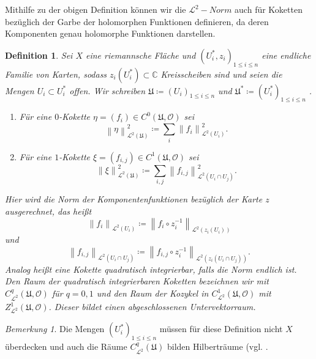 \documentclass[11pt,a4paper,toc=bibliography]{scrartcl}
\theoremstyle{thm}
\theoremstyle{def}
\newtheorem{defi}{Definition}[section]
\theoremstyle{remark}
\newtheorem*{bem}{Bemerkung}
\newcommand*{\norm}[1]{\left\lVert#1\right\rVert} %
\begin{document}
Mithilfe zu der obigen Definition können wir die $\mathcal{L}^2-Norm$ auch für Koketten bezüglich der Garbe der holomorphen Funktionen definieren, da deren Komponenten genau holomorphe Funktionen darstellen.
\begin{defi}
Sei $X$ eine riemannsche Fläche und $\left( U_i^{*},z_i\right)_{1\leq i\leq n}$ eine endliche Familie von Karten, sodass $z_i(U_i^{*})\subset \mathbb{C}$ Kreisscheiben sind und seien die Mengen $U_i\subset U_i^{*}$ offen. Wir schreiben $\mathfrak{U}\coloneqq\left( U_i \right)_{1\leq i\leq n}$ und $\mathfrak{U}^{*}\coloneqq\left( U_i^{*}\right)_{1\leq i\leq n}$ .
\begin{enumerate}
\item
Für eine $0$-Kokette $\eta = (f_i)\in C^0(\mathfrak{U},\mathcal{O})$ sei
$$
\norm{\eta}_{\mathcal{L}^2(\mathfrak{U})}^2 \coloneqq \sum_i \norm{f_i}_{\mathcal{L}^2(U_i)}^2.
$$
\item
Für eine $1$-Kokette $\xi= (f_{i,j})\in C^1(\mathfrak{U,\mathcal{O}}) $ sei 
$$
\norm{\xi}_{\mathcal{L}^2 (\mathfrak{U})}^2\coloneqq \sum_{i,j} \norm{f_{i,j}}_{\mathcal{L}^2(U_i\cap U_j)}^2.
$$
\end{enumerate} 
Hier wird die Norm der Komponentenfunktionen bezüglich der Karte $z$ ausgerechnet, das heißt
$$
\norm{f_i}_{\mathcal{L}^2(U_i)} \coloneqq \norm{f_i\circ z_i^{-1}}_{\mathcal{L}^2(z_i(U_i))}
$$ 
und 
$$
\norm{f_{i,j}}_{\mathcal{L}^2(U_i\cap U_j)}\coloneqq \norm{f_{i,j}\circ z_i^{-1}}_{\mathcal{L}^2(z_i(U_i\cap U_j))}.
$$
Analog heißt eine Kokette \emph{quadratisch integrierbar}, falls die Norm endlich ist. \\Den Raum der quadratisch integrierbaren Koketten bezeichnen wir mit $C^q_{\mathcal{L}^2}(\mathfrak{U},\mathcal{O})$ für $q=0,1$ und den Raum der Kozykel in $C^1_{\mathcal{L}^2}(\mathfrak{U},\mathcal{O})$ mit $Z^1_{\mathcal{L}^2}(\mathfrak{U},\mathcal{O})$. Dieser bildet einen abgeschlossenen Untervektorraum.
\end{defi}
\begin{bem}
Die Mengen $(U^*_i)_{1\leq i\leq n }$ müssen für diese Definition nicht $X$ überdecken und auch die Räume $C^q_{\mathcal{L}^2}(\mathfrak{U})$ bilden Hilberträume (vgl. \cite[~S.112]{forster}.
\end{bem}
\end{document}
